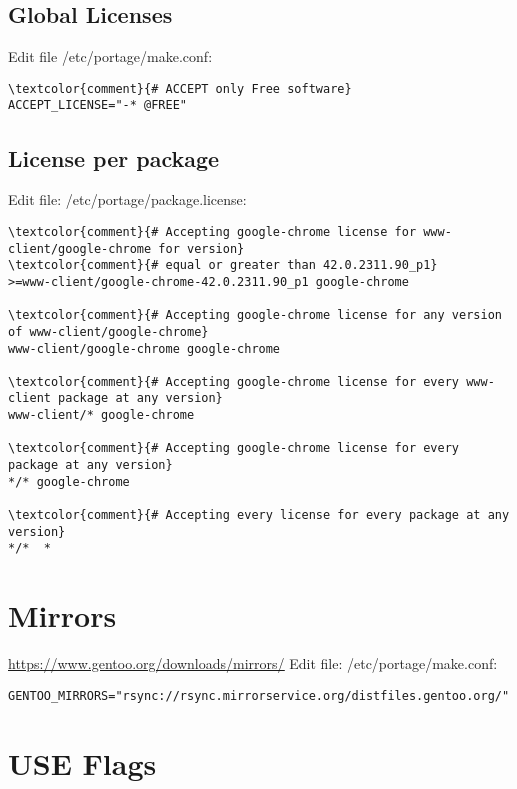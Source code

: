 \documentclass[10pt, a4paper, onecolumn, openany]{book}         %
\begin{document}
\subsection{Global Licenses}
Edit file \textcolor{file}{/etc/portage/make.conf}:
\begin{Verbatim}[commandchars=\\\{\}]
\textcolor{comment}{# ACCEPT only Free software}
ACCEPT_LICENSE="-* @FREE"
\end{Verbatim}
\subsection{License per package}
Edit file: \textcolor{file}{/etc/portage/package.license}:
\begin{Verbatim}[commandchars=\\\{\}]
\textcolor{comment}{# Accepting google-chrome license for www-client/google-chrome for version}
\textcolor{comment}{# equal or greater than 42.0.2311.90_p1}
>=www-client/google-chrome-42.0.2311.90_p1 google-chrome

\textcolor{comment}{# Accepting google-chrome license for any version of www-client/google-chrome}
www-client/google-chrome google-chrome

\textcolor{comment}{# Accepting google-chrome license for every www-client package at any version}
www-client/* google-chrome

\textcolor{comment}{# Accepting google-chrome license for every package at any version}
*/* google-chrome

\textcolor{comment}{# Accepting every license for every package at any version}
*/*  *
\end{Verbatim}

\section{Mirrors}
\underline{\url{https://www.gentoo.org/downloads/mirrors/}}\newline
Edit file: \textcolor{file}{/etc/portage/make.conf}:
\begin{Verbatim}[commandchars=\\\{\}]
GENTOO_MIRRORS="rsync://rsync.mirrorservice.org/distfiles.gentoo.org/"
\end{Verbatim}





\section{USE Flags}
\end{document}
